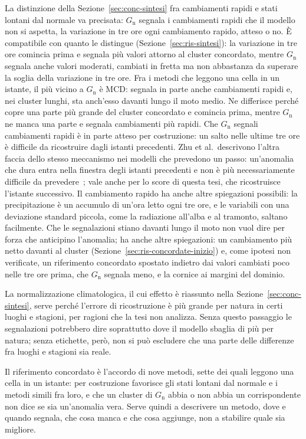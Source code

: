 La distinzione della Sezione~\ref{sec:conc-sintesi} fra cambiamenti rapidi e stati lontani dal normale va precisata: $G_{\mathrm{n}}$ segnala i cambiamenti rapidi che il modello non si aspetta, la variazione in tre ore ogni cambiamento rapido, atteso o no. È compatibile con quanto le distingue (Sezione~\ref{sec:ris-sintesi}): la variazione in tre ore comincia prima e segnala più valori attorno al cluster concordato, mentre $G_{\mathrm{n}}$ segnala anche valori moderati, cambiati in fretta ma non abbastanza da superare la soglia della variazione in tre ore. Fra i metodi che leggono una cella in un istante, il più vicino a $G_{\mathrm{n}}$ è MCD: segnala in parte anche cambiamenti rapidi e, nei cluster lunghi, sta anch'esso davanti lungo il moto medio. Ne differisce perché copre una parte più grande del cluster concordato e comincia prima, mentre $G_{\mathrm{n}}$ ne manca una parte e segnala cambiamenti più rapidi. Che $G_{\mathrm{n}}$ segnali cambiamenti rapidi è in parte atteso per costruzione: un salto nelle ultime tre ore è difficile da ricostruire dagli istanti precedenti. Zhu et al.\ descrivono l'altra faccia dello stesso meccanismo nei modelli che prevedono un passo: un'anomalia che dura entra nella finestra degli istanti precedenti e non è più necessariamente difficile da prevedere~\cite{zhu2026oneliners}; vale anche per lo score di questa tesi, che ricostruisce l'istante successivo. Il cambiamento rapido ha anche altre spiegazioni possibili: la precipitazione è un accumulo di un'ora letto ogni tre ore, e le variabili con una deviazione standard piccola, come la radiazione all'alba e al tramonto, saltano facilmente. Che le segnalazioni stiano davanti lungo il moto non vuol dire per forza che anticipino l'anomalia; ha anche altre spiegazioni: un cambiamento più netto davanti al cluster (Sezione~\ref{sec:ris-concordate-inizio}) e, come ipotesi non verificate, un riferimento concordato spostato indietro dai valori cambiati poco nelle tre ore prima, che $G_{\mathrm{n}}$ segnala meno, e la cornice ai margini del dominio.

La normalizzazione climatologica, il cui effetto è riassunto nella Sezione~\ref{sec:conc-sintesi}, serve perché l'errore di ricostruzione è più grande per natura in certi luoghi e stagioni, per ragioni che la tesi non analizza. Senza questo passaggio le segnalazioni potrebbero dire soprattutto dove il modello sbaglia di più per natura; senza etichette, però, non si può escludere che una parte delle differenze fra luoghi e stagioni sia reale.

Il riferimento concordato è l'accordo di nove metodi, sette dei quali leggono una cella in un istante: per costruzione favorisce gli stati lontani dal normale e i metodi simili fra loro, e che un cluster di $G_{\mathrm{n}}$ abbia o non abbia un corrispondente non dice se sia un'anomalia vera. Serve quindi a descrivere un metodo, dove e quando segnala, che cosa manca e che cosa aggiunge, non a stabilire quale sia migliore.

